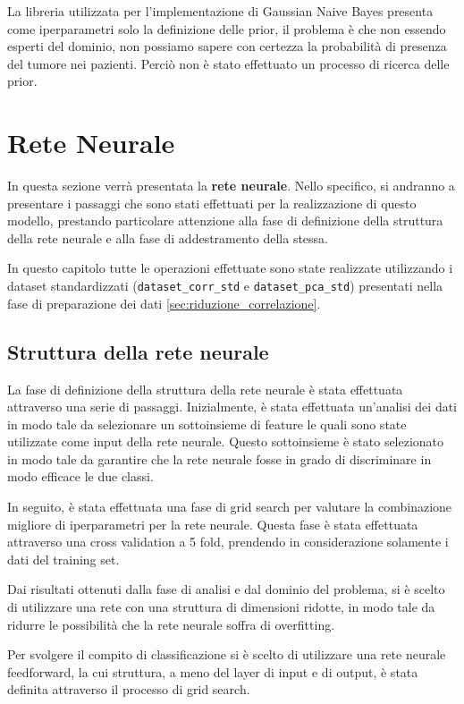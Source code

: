 La libreria utilizzata per l'implementazione di Gaussian Naive Bayes
presenta come iperparametri solo la definizione delle prior, il problema è che non
essendo esperti del dominio, non possiamo sapere con certezza la probabilità 
di presenza del tumore nei pazienti. Perciò non è stato effettuato un processo di 
ricerca delle prior.

\section{Rete Neurale}
In questa sezione verrà presentata la \textbf{rete neurale}. Nello specifico, si
andranno a presentare i passaggi che sono stati effettuati per la realizzazione
di questo modello, prestando particolare attenzione alla fase di definizione
della struttura della rete neurale e alla fase di addestramento della stessa.

In questo capitolo tutte le operazioni effettuate sono state realizzate
utilizzando i dataset standardizzati (\texttt{dataset\_corr\_std} e
\texttt{dataset\_pca\_std}) presentati nella fase di preparazione dei
dati \ref{sec:riduzione_correlazione}.
\subsection{Struttura della rete neurale}
La fase di definizione della struttura della rete neurale è stata effettuata
attraverso una serie di passaggi. Inizialmente, è stata effettuata un'analisi
dei dati in modo tale da selezionare un sottoinsieme di feature le quali sono
state utilizzate come input della rete neurale. Questo sottoinsieme è stato
selezionato in modo tale da garantire che la rete neurale fosse in grado di
discriminare in modo efficace le due classi.

In seguito, è stata effettuata una fase di grid search per valutare la combinazione
migliore di iperparametri per la rete neurale. Questa fase è stata effettuata
attraverso una cross validation a 5 fold, prendendo in considerazione solamente
i dati del training set.

Dai risultati ottenuti dalla fase di analisi e dal dominio del problema, si è
scelto di utilizzare una rete con una struttura di dimensioni ridotte, in modo
tale da ridurre le possibilità che la rete neurale soffra di overfitting.

Per svolgere il compito di classificazione si è scelto di utilizzare una rete
neurale feedforward, la cui struttura, a meno del layer di input e di output, è
stata definita attraverso il processo di grid search.
